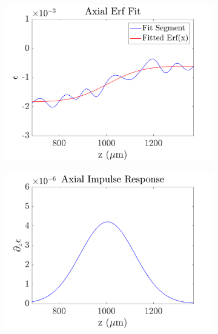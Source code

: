 \begin{figure}[t]
	\centering
	\begin{subfigure}{0.49\textwidth}
		\centering
		\includegraphics[width=\textwidth]{strainreview_figs/axial_erf_fit.png}
	\end{subfigure}
	\begin{subfigure}{0.49\textwidth}
		\centering
		\includegraphics[width=\textwidth]{strainreview_figs/axial_impulse_response.png}
	\end{subfigure}
	\\
	\begin{subfigure}{0.49\textwidth}
		\centering

\end{subfigure}
\end{figure}
